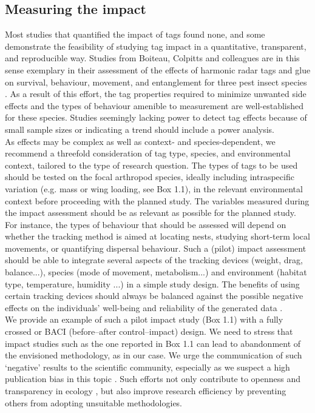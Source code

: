 \documentclass[10pt, twoside]{book} %
\begin{document}
	\subsection{Measuring the impact}
	Most studies that quantified the impact of tags found none, and some demonstrate the feasibility of studying tag impact in a quantitative, transparent, and reproducible way. Studies from Boiteau, Colpitts and colleagues are in this sense exemplary in their assessment of the effects of harmonic radar tags and glue on survival, behaviour, movement, and entanglement for three pest insect species \citep[i.a.][for full list see table S3]{boiteau2001, boiteau2009, boiteau2010, boiteau2011}. As a result of this effort, the tag properties required to minimize unwanted side effects and the types of behaviour amenible to measurement are well-established for these species. Studies seemingly lacking power to detect tag effects because of small sample sizes or indicating a trend \citep[e.g.][]{lee2016} should include a power analysis.\\
	
	As effects may be complex as well as context- and species-dependent, we recommend a threefold consideration of tag type, species, and environmental context, tailored to the type of research question. The types of tags to be used should be tested on the focal arthropod species, ideally including intraspecific variation (e.g. mass or wing loading, see Box 1.1), in the relevant environmental context before proceeding with the planned study. The variables measured during the impact assessment should be as relevant as possible for the planned study. For instance, the types of behaviour that should be assessed will depend on whether the tracking method is aimed at locating nests, studying short-term local movements, or quantifying dispersal behaviour. Such a (pilot) impact assessment should be able to integrate several aspects of the tracking devices (weight, drag, balance...), species (mode of movement, metabolism...) and environment (habitat type, temperature, humidity ...) in a simple study design. The benefits of using certain tracking devices should always be balanced against the possible negative effects on the individuals' well-being and reliability of the generated data \citep{barron2010}.\\
	
	We provide an example of such a pilot impact study (Box 1.1) with a fully crossed or BACI (before--after control--impact) design. We need to stress that impact studies such as the one reported in Box 1.1 can lead to abandonment of the envisioned methodology, as in our case. We urge the communication of such `negative' results to the scientific community, especially as we suspect a high publication bias in this topic \citep{cassey2004}. Such efforts not only contribute to openness and transparency in ecology \citep{parker2016}, but also improve research efficiency by preventing others from adopting unsuitable methodologies.\\
	
\end{document}
